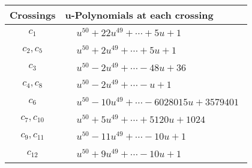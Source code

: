 \documentclass[1p]{elsarticle_modified}
\theoremstyle{definition}
\begin{document}
\begin{tabular}{m{50pt}|m{274pt}}
Crossings & \hspace{64pt}u-Polynomials at each crossing \\
\hline $$\begin{aligned}c_{1}\end{aligned}$$&$\begin{aligned}
&u^{50}+22 u^{49}+\cdots+5 u+1
\end{aligned}$\\
\hline $$\begin{aligned}c_{2},c_{5}\end{aligned}$$&$\begin{aligned}
&u^{50}+2 u^{49}+\cdots+5 u+1
\end{aligned}$\\
\hline $$\begin{aligned}c_{3}\end{aligned}$$&$\begin{aligned}
&u^{50}-2 u^{49}+\cdots-48 u+36
\end{aligned}$\\
\hline $$\begin{aligned}c_{4},c_{8}\end{aligned}$$&$\begin{aligned}
&u^{50}-2 u^{49}+\cdots- u+1
\end{aligned}$\\
\hline $$\begin{aligned}c_{6}\end{aligned}$$&$\begin{aligned}
&u^{50}-10 u^{49}+\cdots-6028015 u+3579401
\end{aligned}$\\
\hline $$\begin{aligned}c_{7},c_{10}\end{aligned}$$&$\begin{aligned}
&u^{50}+5 u^{49}+\cdots+5120 u+1024
\end{aligned}$\\
\hline $$\begin{aligned}c_{9},c_{11}\end{aligned}$$&$\begin{aligned}
&u^{50}-11 u^{49}+\cdots-10 u+1
\end{aligned}$\\
\hline $$\begin{aligned}c_{12}\end{aligned}$$&$\begin{aligned}
&u^{50}+9 u^{49}+\cdots-10 u+1
\end{aligned}$\\
\hline
\end{tabular}\\~\\
\end{document}
